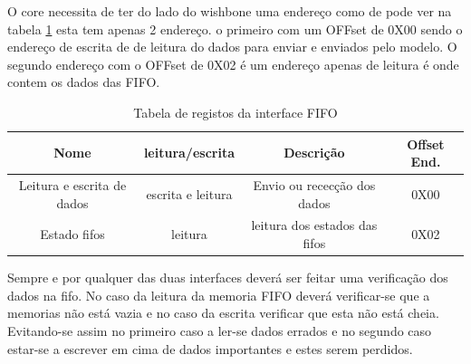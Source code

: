 O core necessita de ter do lado do wishbone uma endereço como de pode ver na tabela \ref{table:registos_Interface_FIFO} esta tem apenas 2 endereço. o primeiro com um OFFset de 0X00 sendo o endereço de escrita de de leitura do dados para enviar e enviados pelo modelo. O segundo endereço com o OFFset de 0X02 é um endereço apenas de leitura é onde contem os dados das FIFO.

\begin{table}[h!]
  \begin{center}
    \begin{tabular}{|c|c|c|c|}
      \hline
      Nome & leitura/escrita & Descrição & Offset End. \\
      \hline \hline
      Leitura e escrita de dados& escrita e leitura & Envio ou rececção dos dados& 0X00 \\
      \hline
      Estado fifos & leitura & leitura dos estados das fifos& 0X02 \\
      \hline
    \end{tabular}
  \end{center}
  \caption[Tabela de registo do core Interface FIFO]{Tabela de registos da interface FIFO}
  \label{table:registos_Interface_FIFO}
\end{table}


Sempre e por qualquer das duas interfaces deverá ser feitar uma verificação dos dados na fifo. No caso da leitura da memoria FIFO deverá verificar-se que a memorias não está vazia e no caso da escrita verificar que esta não está cheia. Evitando-se assim no primeiro caso a ler-se dados errados e no segundo caso estar-se a escrever em cima de dados importantes e estes serem perdidos.